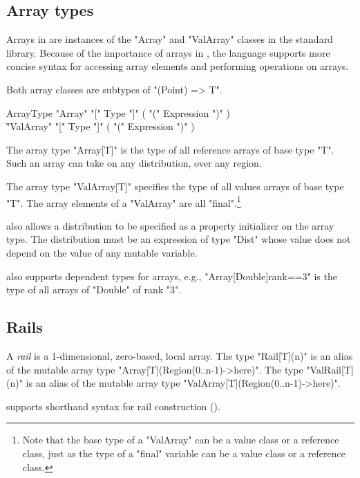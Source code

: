 \subsection{Array types}
\label{ArrayTypeConstructors}

Arrays in \Xten are instances of the 
\xcd"Array" and \xcd"ValArray"
classes in the standard library.
Because of the importance of arrays in \Xten{}, the language
supports more concise syntax for accessing array elements and
performing operations on arrays.

Both array classes are subtypes of
\xcd"(Point) => T".


\begin{grammar}
  ArrayType \: \xcd"Array" \xcd"[" Type \xcd"]" ( \xcd"(" Expression \xcd")" )\opt \\
     \| \xcd"ValArray" \xcd"[" Type \xcd"]" ( \xcd"(" Expression \xcd")" )\opt
\end{grammar}

The array type \xcd"Array[T]" is the type of all
reference arrays of base type \xcd"T". Such an array can take on any
distribution, over any region. 

The array type \xcd"ValArray[T]" specifies the type of all
values arrays of base type \xcd"T".
The array elements of a \xcd"ValArray" are
all \xcd"final".\footnote{Note that the base type of a
\xcd"ValArray" can be a value class or a reference class, just as the 
type of a \xcd"final" variable can be a value class or a reference class.}

\XtenCurrVer{} also allows a distribution to be specified 
as a property initializer on the array type.
The distribution must be an expression of type
\xcd"Dist" whose
value does not depend on the value of any mutable variable.

\Xten{} also supports dependent types for arrays,
e.g.,
\xcd"Array[Double]{rank==3}" is the type of all arrays of 
\xcd"Double" of rank \xcd"3".

\subsection{Rails}

A \emph{rail} is a 1-dimensional, zero-based, local array. 
The type \xcd"Rail[T](n)" is an alias of the mutable array type
\xcd"Array[T](Region(0..n-1)->here)".
The type \xcd"ValRail[T](n)" is an alias of the mutable array type
\xcd"ValArray[T](Region(0..n-1)->here)".

\Xten{} supports shorthand syntax for rail construction
().
